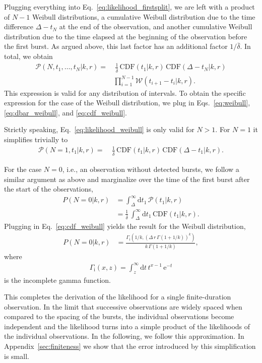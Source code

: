 \documentclass[fleqn,usenatbib]{mnras}
\renewcommand{\d}{\delta}
\begin{document}
Plugging everything into Eq.~\eqref{eq:likelihood_firstsplit}, we are left with a product of $N - 1$ Weibull distributions, a cumulative Weibull distribution due to the time difference $\Delta - t_N$ at the end of the observation, and another cumulative Weibull distribution due to the time elapsed at the beginning of the observation before the first burst. As argued above, this last factor has an additional factor $1/\bar{\d}$. In total, we obtain
\begin{align}
	\label{eq:likelihood_weibull}
	\mathcal{P}(N,t_1,\dots,t_N|k,r) =& ~\frac{1}{\bar{\d}} \, \mathrm{CDF}(t_1|k,r) \, \mathrm{CDF}(\Delta - t_N|k,r)\nonumber\\
	&\prod_{i=1}^{N-1} \mathcal{W}(t_{i+1} - t_i|k,r).
\end{align}
This expression is valid for any distribution of intervals. To obtain the specific expression for the case of the Weibull distribution, we plug in Eqs.~\eqref{eq:weibull}, \eqref{eq:dbar_weibull}, and \eqref{eq:cdf_weibull}.

Strictly speaking, Eq.~\eqref{eq:likelihood_weibull} is only valid for $N > 1$. For $N = 1$ it simplifies trivially to
\begin{align}
	\label{eq:likelihood_N1}
	\mathcal{P}(N=1,t_1|k,r) =& ~\frac{1}{\bar{\d}} \, \mathrm{CDF}(t_1|k,r) \, \mathrm{CDF}(\Delta - t_1|k,r).
\end{align}

For the case $N=0$, i.e., an observation without detected bursts, we follow a similar argument as above and marginalize over the time of the first burst after the start of the observations,
\begin{align}
	P(N=0|k,r) &= \int_\Delta^\infty \mathrm{d}t_1 \, \mathcal{P}(t_1|k,r)\nonumber\\
	&= \frac{1}{\bar{\d}} \, \int_\Delta^\infty \mathrm{d}t_1 \, \mathrm{CDF}(t_1|k,r).
\end{align}
Plugging in Eq.~\eqref{eq:cdf_weibull} yields the result for the Weibull distribution,
\begin{align}
	\label{eq:likelihood_N0}
	P(N=0|k,r) &= \frac{\Gamma_\mathrm{i}{\left(1/k, \left(\Delta\,r\,\Gamma(1+1/k)\right)^k\right)}}{k\,\Gamma{\left(1+1/k\right)}},
\end{align}
where
\begin{align}
	\Gamma_\mathrm{i}(x,z) = \int_z^\infty \mathrm{d}t \, t^{x-1} \, \mathrm{e}^{-t}
\end{align}
is the incomplete gamma function.

This completes the derivation of the likelihood for a single finite-duration observation. In the limit that successive observations are widely spaced when compared to the spacing of the bursts, the individual observations become independent and the likelihood turns into a simple product of the likelihoods of the individual observations. In the following, we follow this approximation. In Appendix~\ref{sec:finiteness} we show that the error introduced by this simplification is small.
\end{document}
